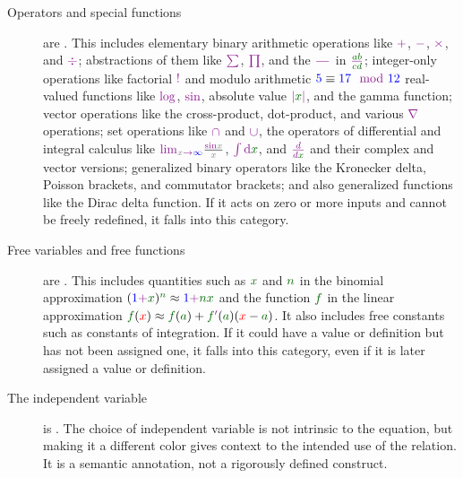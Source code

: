 \documentclass[12pt,letterpaper]{article}
\begin{document}
\begin{description}
  \item[Operators and special functions] are .
      This includes elementary binary arithmetic operations like $\op{+}$, $\op{-}$, $\op{\times}$, and $\op{\div}$;
      abstractions of them like $\op{\sum}$, $\op{\prod}$, and the $\op{\frac{\hspace{1em}}{\hspace{1em}}}$ in $\op{\frac{\fv{a b}}{\fv{c d}}}$;
      integer-only operations like factorial $\op{!}$ and modulo arithmetic $\fc{5} \equiv \fc{17} \op{ \mod{ \fc{12} }}$
      real-valued functions like $\op{\log}$, $\op{\sin}$, absolute value $\op{|}\fv{x}\op{|}$, and the gamma function;
      vector operations like the cross-product, dot-product, and various $\op{\nabla}$ operations;
      set operations like $\op{\cap}$ and $\op{\cup}$,
      the operators of differential and integral calculus like
      $\op{\lim_{\bv{x} \to \fc{\infty}}}\frac{\op{\sin} \bv{x}}{\bv{x}}$,
      $\op{\int \mathrm{d}}\fv{x}$,
      and
      $\op{\frac{d}{d\fv{x}}}$
      and their complex and vector versions;
      generalized binary operators like the Kronecker delta, Poisson brackets, and commutator brackets;
      and also generalized functions like the Dirac delta function.
      If it acts on zero or more inputs and cannot be freely redefined,
      it falls into this category.
    \item[Free variables and free functions] are . This includes quantities such as $\fv{x}$ and $\fv{n}$ in the binomial approximation $(\fc{1}\op{+}\fv{x})^{\fv{n}} \approx \fc{1} \op{+} \fv{n}\fv{x}$
      and the function $\fv{f}$ in the linear approximation $\fv{f}(\iv{x}) \approx \fv{f}(\fv{a}) + \fv{f}\op{'}(\fv{a})(\iv{x}-\fv{a})$.
      It also includes free constants such as constants of integration.
      If it could have a value or definition but has not been assigned one,
      it falls into this category,
      even if it is later assigned a value or definition.
    \item[The independent variable] is .
      The choice of independent variable is not intrinsic to the equation,
      but making it a different color gives context to the intended use of the relation.
      It is a semantic annotation,
      not a rigorously defined construct.


\end{description}
\end{document}
